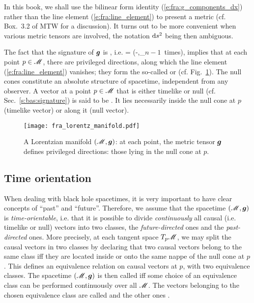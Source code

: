 \begin{remark}
In this book, we shall use the bilinear form identity (\ref{e:fra:g_components_dx}) rather than
the line element (\ref{e:fra:line_element}) to present a metric (cf. Box.~3.2 of MTW \cite{MisneTW73}
for a discussion). It turns out to be more convenient when various metric tensors are
involved, the notation $\mathrm{d} s^2$ being then ambiguous.
\end{remark}

The fact that the signature of $\bm{g}$ is , i.e.
\be
{}\;  = (-,\underbrace{+,\ldots,+}_{\mbox{\small $n-1$ times}}),
\ee
implies that at each point $p\in\mathscr{M}$, there are privileged directions,
along which the line element (\ref{e:fra:line_element}) vanishes; they
form the so-called 
or  (cf. Fig.~\ref{f:fra:lorentz_manifold}).
The null cones constitute an absolute structure of spacetime, independent from any observer.
A vector at a point $p\in\mathscr{M}$ that is either timelike or null
(cf. Sec.~\ref{s:bas:signature})
is said to be .
It lies necessarily inside the null cone at $p$ (timelike vector) or along it (null vector).

\begin{figure}
\centerline{\texttt{[image: fra\_lorentz\_manifold.pdf]}}
\caption[]{\label{f:fra:lorentz_manifold} \footnotesize
A Lorentzian manifold $(\mathscr{M},\bm{g})$: at each point, the metric tensor $\bm{g}$
defines privileged directions: those lying in the null cone at $p$.}
\end{figure}

\subsection{Time orientation} \label{s:fra:time_orientation}

When dealing with black hole spacetimes, it is very important to have clear
concepts of ``past'' and ``future''. Therefore, we assume
that the spacetime $(\mathscr{M}, \bm{g})$ is \emph{time-orientable}, i.e. that it is possible to divide \emph{continuously} all causal (i.e. timelike or null) vectors into
two classes, the \emph{future-directed} ones and the \emph{past-directed} ones.
More precisely, at each tangent space $T_p\mathscr{M}$, we may split the causal
vectors in two classes by declaring that two causal
vectors belong to the same class iff they are located inside
or onto the same nappe of the null cone at $p$. This defines an equivalence
relation on causal vectors at $p$, with two equivalence classes. The spacetime
$(\mathscr{M},\bm{g})$ is then called  iff some choice of an equivalence class
can be performed continuously over all $\mathscr{M}$.
The vectors belonging to the chosen equivalence class are called
 and the other ones
.

